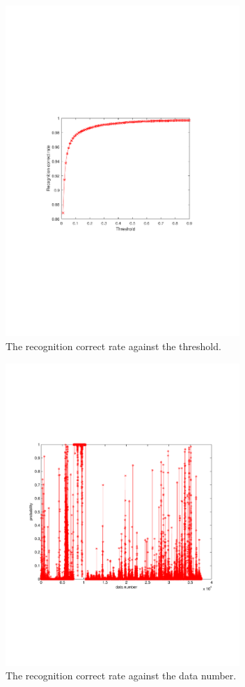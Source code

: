 \begin{figure}[!t]
	\centering
	\includegraphics[width=3.5in]{figures/threashold}
	\caption{The recognition correct rate against the threshold.}
	\label{fig:threshold}
\end{figure}
\begin{figure}[!t]
	\centering
	\includegraphics[width=3.5in]{figures/prob}
	\caption{The recognition correct rate against the data number.}
	\label{fig:prob}
\end{figure}
%
